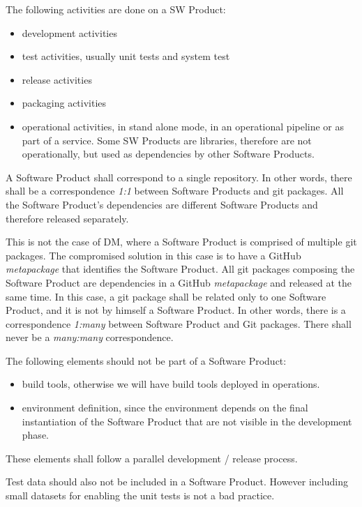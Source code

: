 The following activities are done on a SW Product:
\begin{itemize}
\item development activities
\item test activities, usually unit tests and system test
\item release activities
\item packaging activities
\item operational activities, in stand alone mode, in an operational pipeline or as part of a service. Some SW Products are libraries, therefore are not operationally, but used as dependencies by other Software Products.
\end{itemize}

A Software Product shall correspond to a single repository.
In other  words, there shall be a correspondence \textit{1:1} between Software Products and git packages.
All the Software Product's dependencies are different Software Products and therefore released separately.

This is not the case of DM, where a Software Product is comprised of multiple git packages.
The compromised solution in this case is to have a GitHub \textit{metapackage} that identifies the Software Product.
All git packages composing the Software Product are dependencies in a GitHub \textit{metapackage} and released at the same time.
In this case, a git package shall be related only to one Software Product, and it is not by himself a Software Product.
In other words, there is a correspondence \textit{1:many} between Software Product and Git packages.
There shall never be a \textit{many:many} correspondence.

The following elements should not be part of a Software Product:

\begin{itemize}
\item build tools, otherwise we will have build tools deployed in operations.
\item environment definition, since the environment depends on the final instantiation of the Software Product that are not visible in the development phase.
\end{itemize}

These elements shall follow a parallel development / release process.

Test data should also not be included in a Software Product. However including small datasets for enabling the unit tests is not a bad practice.

